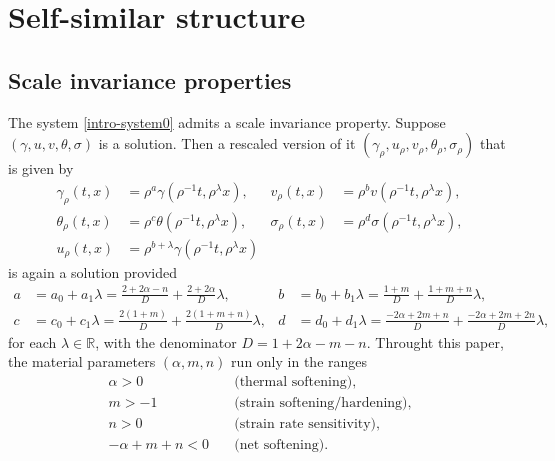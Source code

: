 \documentclass[a4paper,11pt]{article}
\theoremstyle{remark}
\begin{document}
\section{Self-similar structure} \label{sec:scale}

\subsection{Scale invariance properties}
The system \eqref{intro-system0} admits a scale invariance property. Suppose $(\gamma,u,v,\theta,\sigma)$ is a solution. Then a rescaled version of it $(\gamma_\rho,u_\rho,v_\rho,\theta_\rho,\sigma_\rho)$ that is given by
\begin{equation}\label{eq:scale}
\begin{aligned}
 \gamma_\rho(t,x) &= \rho^a\gamma(\rho^{-1}t,\rho^\lambda x), &
 v_\rho(t,x) &= \rho^bv(\rho^{-1}t,\rho^\lambda x),\\
 \theta_\rho(t,x) &= \rho^c\theta(\rho^{-1}t,\rho^\lambda x), &
 \sigma_\rho(t,x) &= \rho^d\sigma(\rho^{-1}t,\rho^\lambda x),\\
 u_\rho(t,x) &= \rho^{b+\lambda}\gamma(\rho^{-1}t,\rho^\lambda x)
\end{aligned}
\end{equation}
is again a solution provided
\begin{equation} \label{eq:exponents}
\begin{aligned}
 a&= a_0 + a_1 \lambda=\frac{2+2\alpha-n}{D} + \frac{2+2\alpha}{D}\lambda, & b&=b_0 + b_1\lambda=\frac{1+m}{D} + \frac{1+m+n}{D}\lambda ,\\
 c&=c_0 + c_1\lambda=\frac{2(1+m)}{D} + \frac{2(1+m+n)}{D}\lambda, & d&=d_0 + d_1\lambda=\frac{-2\alpha + 2m +n}{D} + \frac{-2\alpha+2m+2n}{D}\lambda,
\end{aligned}
\end{equation}
for each $\lambda \in \mathbb{R}$, with the denominator $D = 1+2\alpha-m-n$. Throught this paper, the material parameters $(\alpha,m,n)$ run only in the ranges%
\begin{equation}
 \begin{aligned}
  \alpha>0\quad&\text{(thermal softening)},\\
  m>-1 \quad&\text{(strain softening/hardening)}, \\%
  n>0 \quad&\text{(strain rate sensitivity)},\\ %
  -\alpha+m+n<0 \quad&\text{(net softening)}. \\%
\end{aligned}\label{eq:paramrange}
\end{equation}
\end{document}
